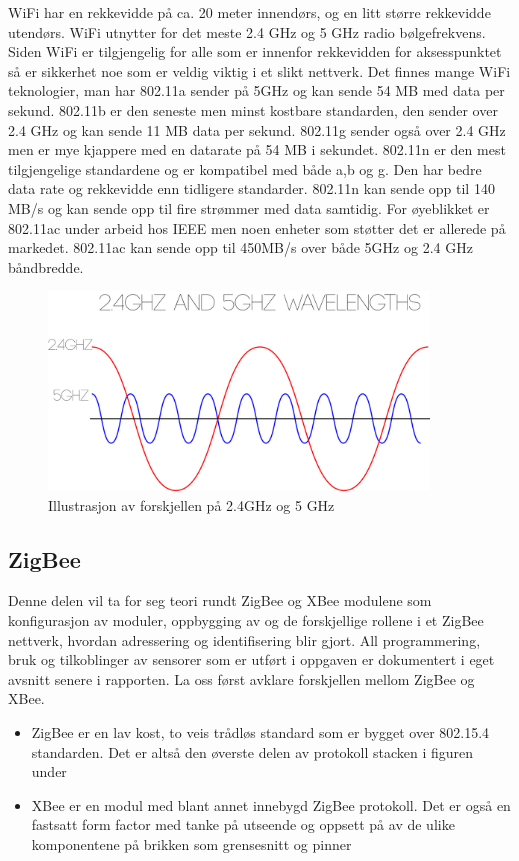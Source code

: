 \documentclass{article}
\begin{document}
WiFi har en rekkevidde på ca. 20 meter innendørs, og en litt større rekkevidde utendørs. WiFi utnytter for det meste 2.4 GHz og 5 GHz radio bølgefrekvens. Siden WiFi er tilgjengelig for alle som er innenfor rekkevidden for aksesspunktet så er sikkerhet noe som er veldig viktig i et slikt nettverk.
Det finnes mange WiFi teknologier, man har 802.11a sender på 5GHz og kan sende 54 MB med data per sekund. 802.11b er den seneste men minst kostbare standarden, den sender over 2.4 GHz og kan sende 11 MB data per sekund. 802.11g sender også over 2.4 GHz men er mye kjappere med en datarate på 54 MB i sekundet. 802.11n er den mest tilgjengelige standardene og er kompatibel med både a,b og g. Den har bedre data rate og rekkevidde enn tidligere standarder. 802.11n kan sende opp til 140 MB/s og kan sende opp til fire strømmer med data samtidig. For øyeblikket er 802.11ac under arbeid hos IEEE men noen enheter som støtter det er allerede på markedet. 802.11ac kan sende opp til 450MB/s over både 5GHz og 2.4 GHz båndbredde.


\begin{figure}[h!]
\centering
    \includegraphics[width=0.9\textwidth]{wavlengths}
\caption{Illustrasjon av forskjellen på 2.4GHz og 5 GHz\cite{wavlengths} }
\end{figure}

\newpage
\subsection{ZigBee}
Denne delen vil ta for seg teori rundt ZigBee og XBee modulene som konfigurasjon av moduler, oppbygging av og de forskjellige rollene i et ZigBee nettverk, hvordan adressering og identifisering blir gjort.  All programmering, bruk og tilkoblinger av sensorer som er utført i oppgaven er dokumentert i eget avsnitt senere i rapporten. La oss først avklare forskjellen mellom ZigBee og XBee.

\begin{itemize}
	\item ZigBee er en lav kost, to veis trådløs standard som er bygget over 802.15.4 standarden. Det er altså den øverste delen av protokoll stacken i figuren under
	\item XBee er en modul med blant annet innebygd ZigBee protokoll. Det er også en fastsatt form factor med tanke på utseende og oppsett på av de ulike komponentene på brikken som grensesnitt og pinner
\end{itemize}
\end{document}
